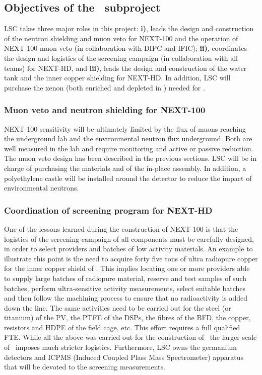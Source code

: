 \subsection{Objectives of the \sLSC\ subproject}
\label{sec.obj.lsc}

LSC takes three major roles in this project: {\bf i)},  leads the design and construction of the neutron shielding and muon veto 
for NEXT-100 and the operation of NEXT-100 muon veto (in collaboration with DIPC and IFIC); {\bf ii)}, coordinates the design and logistics of the 
screening campaign (in collaboration with all teams) for NEXT-HD, and {\bf iii)}, leads the design
and construction of the water tank and the inner copper shielding for NEXT-HD. In addition, LSC will 
purchase the xenon (both enriched and depleted  in \XE) needed for \NHD. 

\subsubsection*{Muon veto and neutron shielding for NEXT-100}

NEXT-100 sensitivity will be ultimately limited by the flux of muons reaching the underground lab and the environmental neutron flux 
underground. Both are well measured in the lab and require monitoring and active or passive reduction. The muon veto design has been described in the previous sections. LSC will be in charge of purchasing the materials and of the in-place assembly. In addition, a polyethylene castle will be installed around the 
detector to reduce the impact of environmental neutrons.

\subsubsection*{Coordination of screening program for NEXT-HD}

One of the lessons learned during the construction of NEXT-100 is that the logistics of the screening campaign of all components must be carefully designed, in order to select providers and batches of low activity materials. An example to illustrate this point is the need to acquire forty five tons of ultra radiopure copper for the inner copper shield of \NHD. This implies locating one or more providers able to supply large batches of radiopure material, reserve and test samples of such batches, perform ultra-sensitive activity measurements, select suitable batches and then follow the machining process to ensure that no radioactivity is added down the line. The same activities need to be carried out for the steel (or titanium) of the PV, the PTFE of the DSPs, the fibres of the BFD, the copper, resistors and HDPE of the field cage, etc. This effort requires a full qualified FTE. While all the above was carried out for the construction of \Next\, the larger scale of \NHD\ imposes much stricter logistics. Furthermore, LSC owns the germanium detectors and ICPMS (Induced Coupled Plass Mass Spectrometer) apparatus that will be devoted to the screening measurements.

